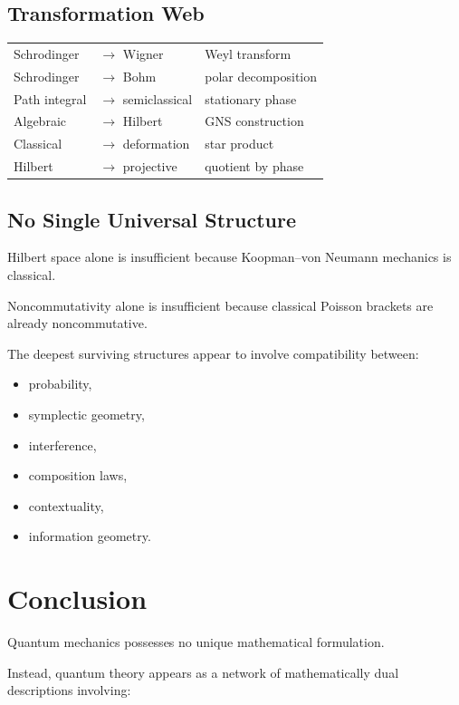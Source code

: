 \documentclass[11pt]{book}
\begin{document}
\section{Transformation Web}

\begin{center}
\begin{tabular}{lll}
Schrodinger & $\to$ Wigner & Weyl transform \\
Schrodinger & $\to$ Bohm & polar decomposition \\
Path integral & $\to$ semiclassical & stationary phase \\
Algebraic & $\to$ Hilbert & GNS construction \\
Classical & $\to$ deformation & star product \\
Hilbert & $\to$ projective & quotient by phase
\end{tabular}
\end{center}

\section{No Single Universal Structure}

Hilbert space alone is insufficient because Koopman--von Neumann mechanics is classical.

Noncommutativity alone is insufficient because classical Poisson brackets are already noncommutative.

The deepest surviving structures appear to involve compatibility between:

\begin{itemize}
\item probability,
\item symplectic geometry,
\item interference,
\item composition laws,
\item contextuality,
\item information geometry.
\end{itemize}

\chapter{Conclusion}

Quantum mechanics possesses no unique mathematical formulation.

Instead, quantum theory appears as a network of mathematically dual descriptions involving:
\end{document}

